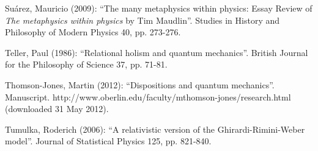 \documentclass[12pt,a4paper]{article}
\theoremstyle{definition}
\begin{document}
{\vspace{0.3cm}   \noindent  Su\'arez, Mauricio (2009): ``The many metaphysics within physics: Essay Review of \emph{The metaphysics within physics} by Tim Maudlin''. Studies in History and Philosophy of Modern Physics 40, pp. 273-276. 

\vspace{0.3cm}   \noindent  Teller, Paul (1986): ``Relational holism and quantum mechanics''. British Journal for the Philosophy of Science 37, pp. 71-81.

\vspace{0.3cm}   \noindent  Thomson-Jones, Martin (2012): ``Dispositions and quantum mechanics''. Manuscript. http://www.oberlin.edu/faculty/mthomson-jones/research.html (downloaded 31 May 2012). 

\vspace{0.3cm}   \noindent  Tumulka, Roderich (2006): ``A relativistic version of the Ghirardi-Rimini-Weber model''. Journal of Statistical Physics 125, pp. 821-840.
}
\end{document}
